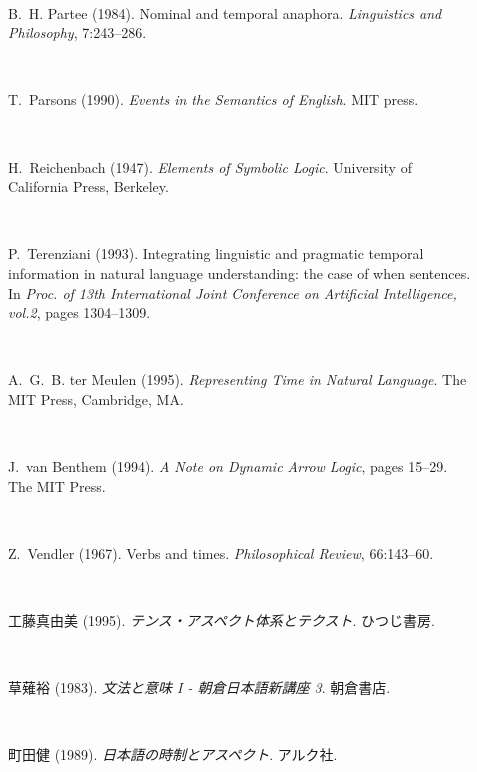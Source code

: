 \begin{description}
\item[~]
B.~H. Partee (1984).
Nominal and temporal anaphora.
{\em Linguistics and Philosophy}, 7:243--286.

\item[~]
T.~Parsons (1990).
{\em Events in the Semantics of {E}nglish}.
MIT press.

\item[~]
H.~Reichenbach (1947).
{\em Elements of Symbolic Logic}.
University of California Press, Berkeley.

\item[~]
P.~Terenziani (1993).
Integrating linguistic and pragmatic temporal information in natural
  language understanding: the case of when sentences.
In {\em Proc. of 13th International Joint Conference on Artificial
  Intelligence, vol.2}, pages 1304--1309.

\item[~]
A.~G.~B. ter Meulen (1995).
{\em Representing Time in Natural Language}.
The MIT Press, Cambridge, MA.

\item[~]
J.~van Benthem (1994).
{\em A Note on Dynamic Arrow Logic}, pages 15--29.
The MIT Press.

\item[~]
Z.~Vendler (1967).
Verbs and times.
{\em Philosophical Review}, 66:143--60.

\item[~]
工藤真由美 (1995).
{\em テンス・アスペクト体系とテクスト}.
ひつじ書房.

\item[~]
草薙裕 (1983). 
{\em 文法と意味 I - 朝倉日本語新講座 3}.
朝倉書店.

\item[~]
町田健 (1989).
{\em 日本語の時制とアスペクト}.
アルク社.
\end{description}



